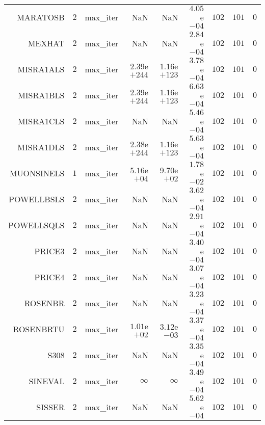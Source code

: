 \begin{longtable}{rrrrrrrrr}
MARATOSB & \(     2\) & max\_iter &       NaN &       NaN & \( 4.05\)e\(-04\) & \(   102\) & \(   101\) & \(     0\) \\
MEXHAT & \(     2\) & max\_iter &       NaN &       NaN & \( 2.84\)e\(-04\) & \(   102\) & \(   101\) & \(     0\) \\
MISRA1ALS & \(     2\) & max\_iter & \(2.39\)e\(+244\) & \(1.16\)e\(+123\) & \( 3.78\)e\(-04\) & \(   102\) & \(   101\) & \(     0\) \\
MISRA1BLS & \(     2\) & max\_iter & \(2.39\)e\(+244\) & \(1.16\)e\(+123\) & \( 6.63\)e\(-04\) & \(   102\) & \(   101\) & \(     0\) \\
MISRA1CLS & \(     2\) & max\_iter &       NaN &       NaN & \( 5.46\)e\(-04\) & \(   102\) & \(   101\) & \(     0\) \\
MISRA1DLS & \(     2\) & max\_iter & \(2.38\)e\(+244\) & \(1.16\)e\(+123\) & \( 5.63\)e\(-04\) & \(   102\) & \(   101\) & \(     0\) \\
MUONSINELS & \(     1\) & max\_iter & \( 5.16\)e\(+04\) & \( 9.70\)e\(+02\) & \( 1.78\)e\(-02\) & \(   102\) & \(   101\) & \(     0\) \\
POWELLBSLS & \(     2\) & max\_iter &       NaN &       NaN & \( 3.62\)e\(-04\) & \(   102\) & \(   101\) & \(     0\) \\
POWELLSQLS & \(     2\) & max\_iter &       NaN &       NaN & \( 2.91\)e\(-04\) & \(   102\) & \(   101\) & \(     0\) \\
PRICE3 & \(     2\) & max\_iter &       NaN &       NaN & \( 3.40\)e\(-04\) & \(   102\) & \(   101\) & \(     0\) \\
PRICE4 & \(     2\) & max\_iter &       NaN &       NaN & \( 3.07\)e\(-04\) & \(   102\) & \(   101\) & \(     0\) \\
ROSENBR & \(     2\) & max\_iter &       NaN &       NaN & \( 3.23\)e\(-04\) & \(   102\) & \(   101\) & \(     0\) \\
ROSENBRTU & \(     2\) & max\_iter & \( 1.01\)e\(+02\) & \( 3.12\)e\(-03\) & \( 3.37\)e\(-04\) & \(   102\) & \(   101\) & \(     0\) \\
S308 & \(     2\) & max\_iter &       NaN &       NaN & \( 3.35\)e\(-04\) & \(   102\) & \(   101\) & \(     0\) \\
SINEVAL & \(     2\) & max\_iter & \(\infty\) & \(\infty\) & \( 3.49\)e\(-04\) & \(   102\) & \(   101\) & \(     0\) \\
SISSER & \(     2\) & max\_iter &       NaN &       NaN & \( 5.62\)e\(-04\) & \(   102\) & \(   101\) & \(     0\) \\

\end{longtable}
